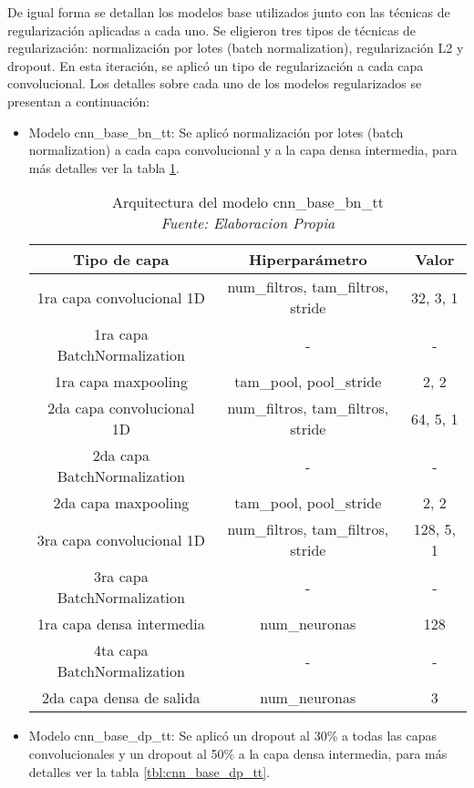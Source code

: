 De igual forma se detallan los modelos base utilizados junto con las técnicas de regularización aplicadas a cada uno. Se eligieron tres tipos de técnicas de regularización: normalización por lotes (batch normalization), regularización L2 y dropout. En esta iteración, se aplicó un tipo de regularización a cada capa convolucional. Los detalles  sobre cada uno de los modelos regularizados se presentan a continuación:

\begin{itemize}

\item Modelo cnn\_base\_bn\_tt: Se aplicó normalización por lotes (batch normalization) a cada capa convolucional y a la capa densa intermedia, para más detalles ver la tabla \ref{tbl:cnn_base_bn_tt}.

\begin{table}[!ht]
	\centering
	\begin{tabular}{|c|c|c|}
		\hline
		\textbf{Tipo de capa} & \textbf{Hiperparámetro} & \textbf{Valor} \\ \hline
		1ra capa convolucional 1D & num\_filtros, tam\_filtros, stride & 32, 3, 1 \\ \hline
		1ra capa BatchNormalization & - & - \\ \hline
		1ra capa maxpooling & tam\_pool, pool\_stride & 2, 2 \\ \hline
		2da capa convolucional 1D & num\_filtros, tam\_filtros, stride & 64, 5, 1 \\ \hline
		2da capa BatchNormalization & - & - \\ \hline
		2da capa maxpooling & tam\_pool, pool\_stride & 2, 2 \\ \hline
		3ra capa convolucional 1D & num\_filtros, tam\_filtros, stride & 128, 5, 1 \\ \hline
		3ra capa BatchNormalization & - & - \\ \hline
		1ra capa densa intermedia & num\_neuronas & 128 \\ \hline
		4ta capa BatchNormalization & - & - \\ \hline
		2da capa densa de salida & num\_neuronas & 3 \\ \hline
	\end{tabular}
	\caption{Arquitectura del modelo cnn\_base\_bn\_tt
		\\\textit{Fuente: Elaboracion Propia}}
	\label{tbl:cnn_base_bn_tt}
\end{table}


\item  Modelo cnn\_base\_dp\_tt: Se aplicó un dropout al 30\% a todas las capas convolucionales y un dropout al 50\% a la capa densa intermedia, para más detalles ver la tabla \ref{tbl:cnn_base_dp_tt}.


\end{itemize}
